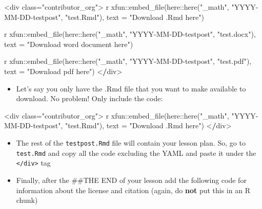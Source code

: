 \documentclass[
]{article}
\newenvironment{Shaded}{\begin{snugshade}}{\end{snugshade}}
\newcommand{\AttributeTok}[1]{\textcolor[rgb]{0.77,0.63,0.00}{#1}}
\newcommand{\ErrorTok}[1]{\textcolor[rgb]{0.64,0.00,0.00}{\textbf{#1}}}
\newcommand{\NormalTok}[1]{#1}
\newcommand{\OtherTok}[1]{\textcolor[rgb]{0.56,0.35,0.01}{#1}}
\newcommand{\SpecialCharTok}[1]{\textcolor[rgb]{0.00,0.00,0.00}{#1}}
\newcommand{\StringTok}[1]{\textcolor[rgb]{0.31,0.60,0.02}{#1}}
\providecommand{\tightlist}{%
  \setlength{\itemsep}{0pt}\setlength{\parskip}{0pt}}
\begin{document}
\begin{Shaded}
\begin{Highlighting}[]
\SpecialCharTok{\textless{}}\NormalTok{div class}\OtherTok{=}\StringTok{"contributor\_org"}\SpecialCharTok{\textgreater{}}
\StringTok{\textasciigrave{}}\AttributeTok{r xfun::embed\_file(here::here("\_math", "YYYY{-}MM{-}DD{-}testpost", "test.Rmd"), text = "Download .Rmd here")}\StringTok{\textasciigrave{}}

\StringTok{\textasciigrave{}}\AttributeTok{r xfun::embed\_file(here::here("\_math", "YYYY{-}MM{-}DD{-}testpost", "test.docx"), text = "Download word document here")}\StringTok{\textasciigrave{}}

\StringTok{\textasciigrave{}}\AttributeTok{r xfun::embed\_file(here::here("\_math", "YYYY{-}MM{-}DD{-}testpost", "test.pdf"), text = "Download pdf here")}\StringTok{\textasciigrave{}}
\SpecialCharTok{\textless{}}\ErrorTok{/}\NormalTok{div}\SpecialCharTok{\textgreater{}}
\end{Highlighting}
\end{Shaded}

\begin{itemize}
\tightlist
\item
  Let's say you only have the .Rmd file that you want to make available
  to download. No problem! Only include the code:
\end{itemize}

\begin{Shaded}
\begin{Highlighting}[]
\SpecialCharTok{\textless{}}\NormalTok{div class}\OtherTok{=}\StringTok{"contributor\_org"}\SpecialCharTok{\textgreater{}}
\StringTok{\textasciigrave{}}\AttributeTok{r xfun::embed\_file(here::here("\_math", "YYYY{-}MM{-}DD{-}testpost", "test.Rmd"), text = "Download .Rmd here")}\StringTok{\textasciigrave{}}
\SpecialCharTok{\textless{}}\ErrorTok{/}\NormalTok{div}\SpecialCharTok{\textgreater{}}
\end{Highlighting}
\end{Shaded}

\begin{itemize}
\item
  The rest of the \texttt{testpost.Rmd} file will contain your lesson
  plan. So, go to \texttt{test.Rmd} and copy all the code excluding the
  YAML and paste it under the \texttt{\textless{}/div\textgreater{}} tag
\item
  Finally, after the \#\#THE END of your lesson add the following code
  for information about the license and citation (again, do \textbf{not}
  put this in an R chunk)
\end{itemize}
\end{document}
